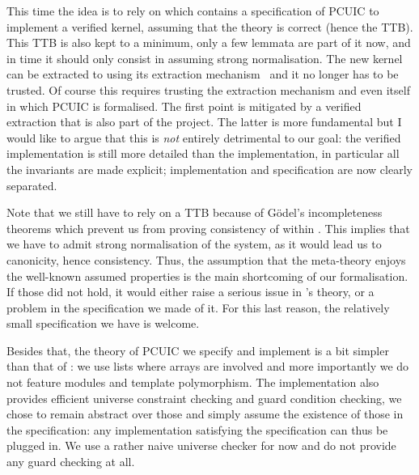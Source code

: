 This time the idea is to rely on \MetaCoq which contains a specification of
\acrshort{PCUIC} to implement a verified kernel, assuming that the theory is
correct (hence the \acrshort{TTB}).
This \acrshort{TTB} is also kept to a minimum, only a few lemmata are part of it
now, and in time it should only consist in assuming strong normalisation.
The new kernel can be extracted to \Coq using its extraction
mechanism~ and it no longer has to be trusted. Of course this
requires trusting the extraction mechanism and even \Coq itself in which
\acrshort{PCUIC} is formalised.
The first point is mitigated by a verified extraction that is also part of the
project. The latter is more fundamental but I would like to argue that this is
\emph{not} entirely detrimental to our goal: the verified implementation is
still more detailed than the \ocaml implementation, in particular all the
invariants are made explicit; implementation and specification are now clearly
separated.

Note that we still have to rely on a \acrshort{TTB} because of Gödel's
incompleteness theorems which prevent us from proving consistency of
\Coq within \Coq.
This implies that we have to admit strong normalisation of the system, as it
would lead us to canonicity, hence consistency.
Thus, the assumption that the meta-theory enjoys the well-known assumed
properties is the main shortcoming of our formalisation. If those did not hold,
it would either raise a serious issue in \Coq's theory, or a problem in the
specification we made of it. For this last reason, the relatively small
specification we have is welcome.

Besides that, the theory of \acrshort{PCUIC} we specify and implement is a bit
simpler than that of \Coq: we use lists where arrays are involved and more
importantly we do not feature modules and template polymorphism.
The implementation also provides efficient universe constraint checking and
guard condition checking, we chose to remain abstract over those and simply
assume the existence of those in the specification: any implementation
satisfying the specification can thus be plugged in. We use a rather naive
universe checker for now and do not provide any guard checking at all.